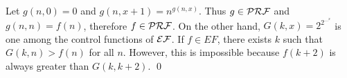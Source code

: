 
\begin{pf} \rm
 Let $g(n, 0) = 0$ and 
 $g(n, x + 1) = n^{ g(n, x)}$. Thus $g\in \mathcal{PRF}$ and $g(n, n) = f(n)$,
 therefore $f\in\mathcal{PRF}$. On the other hand, $G(k, x) = 2^{2^{\ldots^x}}$ is
 one among the control functions of $\mathcal{EF}$. If $f\in EF$, there exists
 $k$ such that $G(k, n) > f(n)$ for all $n$. However, this is impossible
 because $f(k + 2)$ is always greater than $G(k, k+2)$. \qed
\end{pf}



